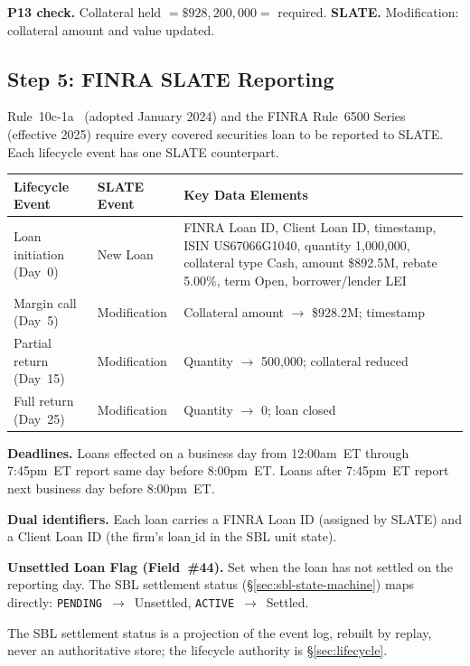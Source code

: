 \noindent\textbf{P13 check.} Collateral held $= \$928{,}200{,}000 =$ required. \checkmark\quad
\textbf{SLATE.} Modification: collateral amount and value updated.

\subsection{Step 5: FINRA SLATE Reporting}
\label{sec:us-step5}

Rule~10c-1a~\cite{sec10c1a} (adopted January 2024) and the FINRA Rule~6500 Series~\cite{finra6500} (effective 2025) require every covered securities loan to be reported to SLATE. Each lifecycle event has one SLATE counterpart.

\begin{center}\small
\begin{tabular}{l l p{6cm}}
\toprule
\textbf{Lifecycle Event} & \textbf{SLATE Event} & \textbf{Key Data Elements} \\
\midrule
Loan initiation (Day~0) & New Loan & FINRA Loan ID, Client Loan ID, timestamp, ISIN US67066G1040, quantity 1{,}000{,}000, collateral type Cash, amount \$892.5M, rebate 5.00\%, term Open, borrower/lender LEI \\
\midrule
Margin call (Day~5) & Modification & Collateral amount $\to$ \$928.2M; timestamp \\
\midrule
Partial return (Day~15) & Modification & Quantity $\to$ 500{,}000; collateral reduced \\
\midrule
Full return (Day~25) & Modification & Quantity $\to$ 0; loan closed \\
\bottomrule
\end{tabular}
\end{center}

\noindent\textbf{Deadlines.} Loans effected on a business day from 12:00am~ET through 7:45pm~ET report same day before 8:00pm~ET. Loans after 7:45pm~ET report next business day before 8:00pm~ET.

\noindent\textbf{Dual identifiers.} Each loan carries a FINRA Loan ID (assigned by SLATE) and a Client Loan ID (the firm's $\mathrm{loan\_id}$ in the SBL unit state).

\noindent\textbf{Unsettled Loan Flag (Field~\#44).} Set when the loan has not settled on the reporting day. The SBL settlement status (\S\ref{sec:sbl-state-machine}) maps directly: \texttt{PENDING}~$\to$~Unsettled, \texttt{ACTIVE}~$\to$~Settled.

\begin{remark}
The SBL settlement status is a projection of the event log, rebuilt by replay, never an authoritative store; the lifecycle authority is \S\ref{sec:lifecycle}.
\end{remark}

